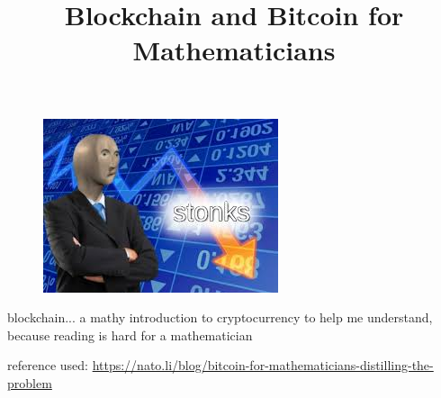 \documentclass[fontsize=9pt]{article}
\title{Blockchain and Bitcoin for Mathematicians}
\begin{document}
\maketitle
\begin{figure}[H]
   \centering 
   \includegraphics[width=0.5\linewidth]{stonks.jpg}
\end{figure}
blockchain... a mathy introduction to cryptocurrency to help me understand, because reading is hard for a mathematician

reference used: \url{https://nato.li/blog/bitcoin-for-mathematicians-distilling-the-problem}
    
\end{document}
